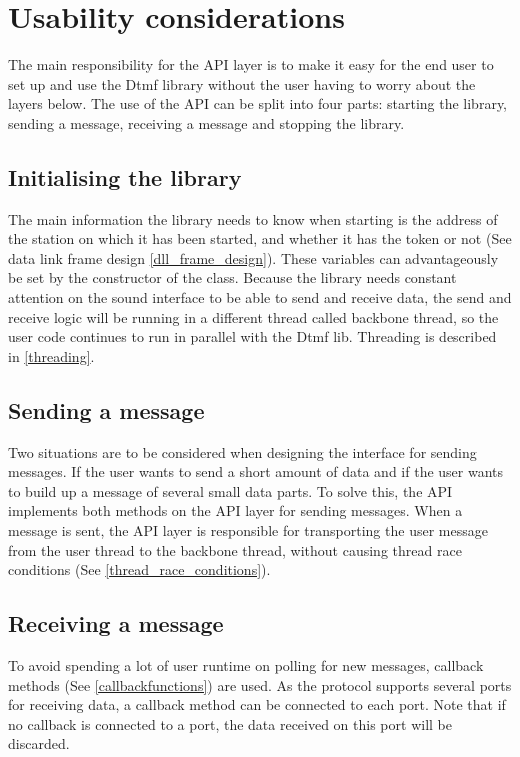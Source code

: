 \section{Usability considerations}
The main responsibility for the API layer is to make it easy for the end user to set up and use the Dtmf library without the user having to worry about the layers below. The use of the API can be split into four parts: starting the library, sending a message, receiving a message and stopping the library. 

\subsection{Initialising the library}
The main information the library needs to know when starting is the address of the station on which it has been started, and whether it has the token or not (See data link frame design \ref{dll_frame_design}). These variables can  advantageously be set by the constructor of the class. Because the library needs constant attention on the sound interface to be able to send and receive data, the send and receive logic will be running in a different thread called backbone thread, so the user code continues to run in parallel with the Dtmf lib. Threading is described in \ref{threading}.

\subsection{Sending a message}
Two situations are to be considered when designing the interface for sending messages. If the user wants to send a short amount of data and if the user wants to build up a message of several small data parts. To solve this, the API implements both methods on the API layer for sending messages. When a message is sent, the API layer is responsible for transporting the user message from the user thread to the backbone thread, without causing thread race conditions (See \ref{thread_race_conditions}).

\subsection{Receiving a message}
To avoid spending a lot of user runtime on polling for new messages, callback methods (See \ref{callbackfunctions}) are used. As the protocol supports several ports for receiving data, a callback method can be connected to each port. Note that if no callback is connected to a port, the data received on this port will be discarded.

